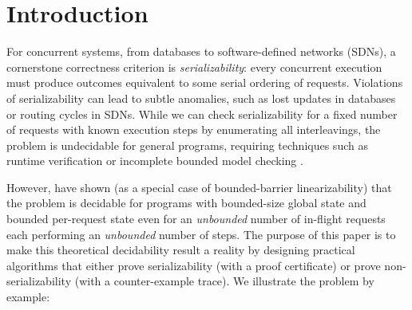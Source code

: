 \section{Introduction}
\label{sec:introduction}

For concurrent systems, from databases to software-defined networks (SDNs), a cornerstone correctness criterion is \emph{serializability}: every concurrent execution must produce outcomes equivalent to some serial ordering of requests. Violations of serializability can lead to subtle anomalies, such as lost updates in databases or routing cycles in SDNs.
While we can check serializability for a fixed number of requests with known execution steps by enumerating all interleavings, the problem is undecidable for general programs, requiring techniques such as runtime verification or incomplete bounded model checking \cite{WaSt06a,WaSt06b,FlFrYi08,FaMa08,SiMaWaGu11a,SiMaWaGu11b,Pa79,AlMcPe96,BiEn19}.

However, \citet{BoEmEnHa13} have shown (as a special case of bounded-barrier linearizability) that the problem is decidable for programs with bounded-size global state and bounded per-request state even for an \emph{unbounded} number of in-flight requests each performing an \emph{unbounded} number of steps. The purpose of this paper is to make this theoretical decidability result a reality by designing practical algorithms that either prove serializability (with a proof certificate) or prove non-serializability (with a counter-example trace).
% 
We illustrate the problem by example:


